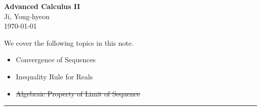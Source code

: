 \documentclass[11pt,openany]{article}
\begin{document}
\begin{center}
	\huge\textbf{Advanced Calculus II}\\
	\vspace{0.5em}
	\large{Ji, Yong-hyeon}\\
	\vspace{0.5em}
	\normalsize{\today}\\
\end{center}

\noindent 
We cover the following topics in this note.
\begin{itemize}
	\item Convergence of Sequences
	\item Inequality Rule for Reals
	\item \st{Algebraic Property of Limit of Sequence}
\end{itemize}
\hrule\vspace{12pt}
\end{document}
